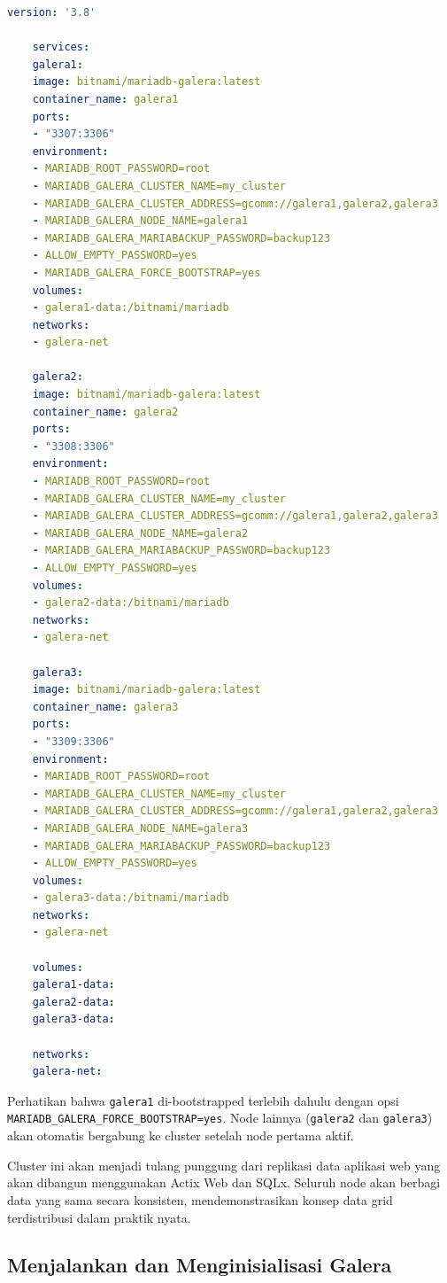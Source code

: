 \begin{lstlisting}[language=yaml, caption={Konfigurasi docker-compose untuk Galera Cluster}, label={lst:galera-cluster}, basicstyle=\scriptsize\ttfamily]
	version: '3.8'
	
	services:
	galera1:
	image: bitnami/mariadb-galera:latest
	container_name: galera1
	ports:
	- "3307:3306"
	environment:
	- MARIADB_ROOT_PASSWORD=root
	- MARIADB_GALERA_CLUSTER_NAME=my_cluster
	- MARIADB_GALERA_CLUSTER_ADDRESS=gcomm://galera1,galera2,galera3
	- MARIADB_GALERA_NODE_NAME=galera1
	- MARIADB_GALERA_MARIABACKUP_PASSWORD=backup123
	- ALLOW_EMPTY_PASSWORD=yes
	- MARIADB_GALERA_FORCE_BOOTSTRAP=yes
	volumes:
	- galera1-data:/bitnami/mariadb
	networks:
	- galera-net
	
	galera2:
	image: bitnami/mariadb-galera:latest
	container_name: galera2
	ports:
	- "3308:3306"
	environment:
	- MARIADB_ROOT_PASSWORD=root
	- MARIADB_GALERA_CLUSTER_NAME=my_cluster
	- MARIADB_GALERA_CLUSTER_ADDRESS=gcomm://galera1,galera2,galera3
	- MARIADB_GALERA_NODE_NAME=galera2
	- MARIADB_GALERA_MARIABACKUP_PASSWORD=backup123
	- ALLOW_EMPTY_PASSWORD=yes
	volumes:
	- galera2-data:/bitnami/mariadb
	networks:
	- galera-net
	
	galera3:
	image: bitnami/mariadb-galera:latest
	container_name: galera3
	ports:
	- "3309:3306"
	environment:
	- MARIADB_ROOT_PASSWORD=root
	- MARIADB_GALERA_CLUSTER_NAME=my_cluster
	- MARIADB_GALERA_CLUSTER_ADDRESS=gcomm://galera1,galera2,galera3
	- MARIADB_GALERA_NODE_NAME=galera3
	- MARIADB_GALERA_MARIABACKUP_PASSWORD=backup123
	- ALLOW_EMPTY_PASSWORD=yes
	volumes:
	- galera3-data:/bitnami/mariadb
	networks:
	- galera-net
	
	volumes:
	galera1-data:
	galera2-data:
	galera3-data:
	
	networks:
	galera-net:
\end{lstlisting}

Perhatikan bahwa \texttt{galera1} di-bootstrapped terlebih dahulu dengan opsi \texttt{MARIADB\_GALERA\_FORCE\_BOOTSTRAP=yes}. Node lainnya (\texttt{galera2} dan \texttt{galera3}) akan otomatis bergabung ke cluster setelah node pertama aktif. 

Cluster ini akan menjadi tulang punggung dari replikasi data aplikasi web yang akan dibangun menggunakan Actix Web dan SQLx. Seluruh node akan berbagi data yang sama secara konsisten, mendemonstrasikan konsep data grid terdistribusi dalam praktik nyata.


\subsection{Menjalankan dan Menginisialisasi Galera}

